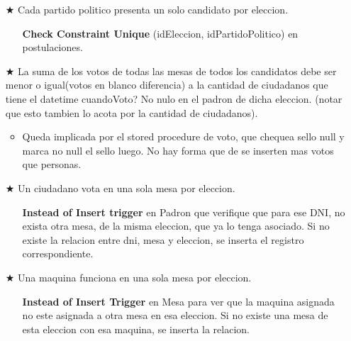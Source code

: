 \vspace{1.2cm}
\begin{itemize}
		\item[$\bigstar$] Cada partido politico presenta un solo candidato por eleccion.
		\begin{itemize}
			\item[\Checkmark] \textbf{Check Constraint Unique} (idEleccion, idPartidoPolitico) en postulaciones.
		\end{itemize}
\end{itemize}
\vspace{1.2cm}
\begin{itemize}
		\item[$\bigstar$] La suma de los votos de todas las mesas de todos los candidatos debe ser menor o igual(votos en blanco diferencia) a la cantidad de ciudadanos que tiene el datetime cuandoVoto? No nulo en el padron de dicha eleccion. (notar que esto tambien lo acota por la cantidad de ciudadanos). 
		\begin{itemize}
			\item{Queda implicada por el stored procedure de voto, que chequea sello null y marca no null el sello luego. No hay forma que de se inserten mas votos que personas}.
		\end{itemize}
\end{itemize}
\vspace{1.2cm}
\begin{itemize}
		\item[$\bigstar$] Un ciudadano vota en una sola mesa por eleccion.
		\begin{itemize}
			\item[\Checkmark] \textbf{Instead of Insert trigger} en Padron que verifique que para ese DNI, no exista otra mesa, de la misma eleccion, que ya lo tenga asociado. Si no existe la relacion entre dni, mesa y eleccion, se inserta el registro correspondiente.
		\end{itemize}
\end{itemize}
\vspace{1.2cm}
\begin{itemize}
		\item[$\bigstar$] Una maquina funciona en una sola mesa por eleccion.
		\begin{itemize}
			\item[\Checkmark] \textbf{Instead of Insert Trigger} en Mesa para ver que la maquina asignada no este asignada a otra mesa en esa eleccion. Si no existe una mesa de esta eleccion con esa maquina, se inserta la relacion. 
		\end{itemize}
\end{itemize}
